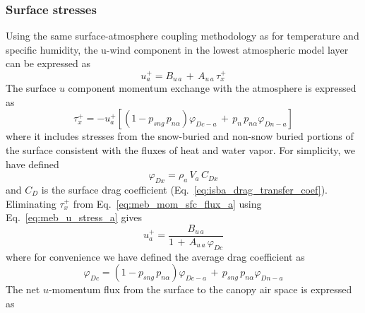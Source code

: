 {\subsubsection{Surface stresses}
\label{surface_stresses}

Using the same surface-atmosphere coupling methodology 
as for temperature and specific humidity, the u-wind component
in the lowest atmospheric model layer can be expressed as
%
\begin{equation}
  \label{eq:meb_u_stress_a}
%
u_a^+ = B_{u\,a} \,+\, A_{u\,a}\, \tau_x^+
%
\end{equation}
%
The surface $u$ component 
momentum exchange with the atmosphere is expressed as
%
\begin{equation}
  \label{eq:meb_mom_sfc_flux_a}
%
\tau_x^+ = -u_{a}^+ 
\left[ \left( 1 - p_{sng}\,p_{n\alpha}\right) \varphi_{Dc-a} \,+\,
p_{n}\,p_{n\alpha} \varphi_{Dn-a} \right]
%
\end{equation}
%
where it includes stresses from the snow-buried and non-snow buried
portions of the surface consistent
with the fluxes of heat and water vapor. For simplicity,
we have defined 
%
\begin{equation}
  \label{eq:meb_u_stress_a}
%
\varphi_{Dx} = \rho_a \, V_a \, C_{Dx} 
%
\end{equation}
%
and $C_D$ is the surface drag coefficient (Eq.~\ref{eq:isba_drag_transfer_coef}).
%
Eliminating $\tau_x^+$ from Eq.~\ref{eq:meb_mom_sfc_flux_a} using
Eq.~\ref{eq:meb_u_stress_a} gives 
%
\begin{equation}
  \label{eq:meb_mom_atmos_n_a}
u_{a}^+ = {\frac {B_{u\,a}}{1 \,+\, A_{u\,a}\,\varphi_{Dc}}}
%
\end{equation}
%
where for convenience we have defined the average drag coefficient as
%
\begin{equation}
  \label{eq:meb_drag_avg_n_a}
\varphi_{Dc} = 
\left( 1 - p_{sng}\,p_{n\alpha}\right) \varphi_{Dc-a} \,+\,
p_{sng}\,p_{n\alpha} \varphi_{Dn-a} 
%
\end{equation}
%
The net $u$-momentum flux from the surface to the canopy
air space is expressed as
%
}
